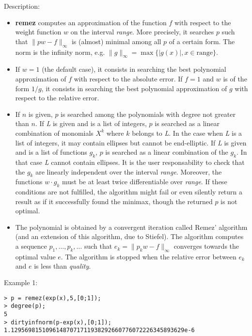 \noindent Description: \begin{itemize}

\item \textbf{remez} computes an approximation of the function $f$ with respect to
   the weight function $w$ on the interval \emph{range}. More precisely, it
   searches $p$ such that $\|pw-f\|_{\infty}$ is
   (almost) minimal among all $p$ of a certain form. The norm is
   the infinity norm, e.g. $\|g\|_{\infty} = \max \{|g(x)|, x \in \mathrm{range}\}.$

\item If $w=1$ (the default case), it consists in searching the best
   polynomial approximation of $f$ with respect to the absolute error.
   If $f=1$ and $w$ is of the form $1/g$, it consists in
   searching the best polynomial approximation of $g$ with respect to the
   relative error.

\item If $n$ is given, $p$ is searched among the polynomials with degree not
   greater than $n$.
   If \emph{L} is given and is a list of integers, $p$ is searched as a linear
   combination of monomials $X^k$ where $k$ belongs to \emph{L}.
   In the case when \emph{L} is a list of integers, it may contain ellipses but cannot
   be end-elliptic.
   If \emph{L} is given and is a list of functions $g_k$, $p$ is searched as a
   linear combination of the $g_k$. In that case \emph{L} cannot contain ellipses.
   It is the user responsability to check that the $g_k$ are linearly independent
   over the interval \emph{range}. Moreover, the functions $w\cdot g_k$ must be at least
   twice differentiable over \emph{range}. If these conditions are not fulfilled, the
   algorithm might fail or even silently return a result as if it successfully
   found the minimax, though the returned $p$ is not optimal.

\item The polynomial is obtained by a convergent iteration called Remez'
   algorithm (and an extension of this algorithm, due to Stiefel).
   The algorithm computes a sequence $p_1,\dots ,p_k,\dots$
   such that $e_k = \|p_k w-f\|_{\infty}$ converges towards
   the optimal value $e$. The algorithm is stopped when the relative error
   between $e_k$ and $e$ is less than \emph{quality}.
\end{itemize}
\noindent Example 1: 
\begin{center}\begin{minipage}{15cm}\begin{Verbatim}[frame=single]
> p = remez(exp(x),5,[0;1]);
> degree(p);
5
> dirtyinfnorm(p-exp(x),[0;1]);
1.12956981510961487071711938292660776072226345893629e-6
\end{Verbatim}
\end{minipage}\end{center}
